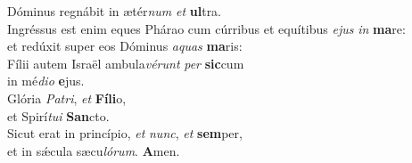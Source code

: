 \evenverse Dóminus regnábit in ætér\textit{num} \textit{et} \textbf{ul}tra.\\
\oddverse Ingréssus est enim eques Phárao cum cúrribus et equítibus \textit{e}\textit{jus} \textit{in} \textbf{ma}re:~\*\\
\oddverse et redúxit super eos Dóminus \textit{a}\textit{quas} \textbf{ma}ris:\\
\evenverse Fílii autem Israël ambula\textit{vé}\textit{runt} \textit{per} \textbf{sic}cum~\*\\
\evenverse in mé\textit{di}\textit{o} \textbf{e}jus.\\
\oddverse Glória \textit{Pa}\textit{tri}, \textit{et} \textbf{Fí}\textbf{li}o,~\*\\
\oddverse et Spirí\textit{tu}\textit{i} \textbf{San}cto.\\
\evenverse Sicut erat in princípio, \textit{et} \textit{nunc}, \textit{et} \textbf{sem}per,~\*\\
\evenverse et in sǽcula sæcu\textit{ló}\textit{rum}. \textbf{A}men.\\
